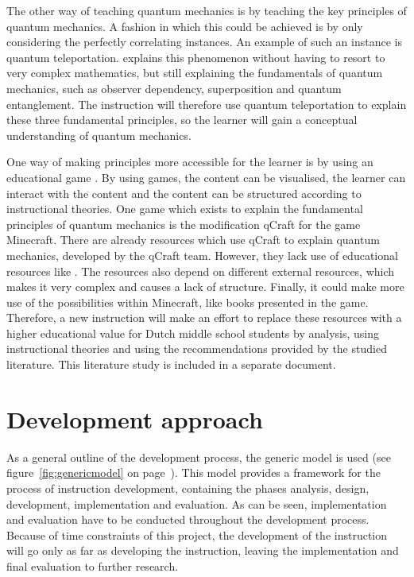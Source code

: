 \documentclass[11pt,twoside]{report} %
\begin{document}
The other way of teaching quantum mechanics is by teaching the key principles of quantum mechanics. A fashion in which this could be achieved is by only considering the perfectly correlating instances. An example of such an instance is quantum teleportation.  explains this phenomenon without having to resort to very complex mathematics, but still explaining the fundamentals of quantum mechanics, such as observer dependency, superposition and quantum entanglement. The instruction will therefore use quantum teleportation to explain these three fundamental principles, so the learner will gain a conceptual understanding of quantum mechanics.

One way of making principles more accessible for the learner is by using an educational game \cite{wouters}. By using games, the content can be visualised, the learner can interact with the content and the content can be structured according to instructional theories. One game which exists to explain the fundamental principles of quantum mechanics is the modification qCraft for the game Minecraft. There are already resources which use qCraft to explain quantum mechanics, developed by the qCraft team. However, they lack use of educational resources like . The resources also depend on different external resources, which makes it very complex and causes a lack of structure. Finally, it could make more use of the possibilities within Minecraft, like books presented in the game. Therefore, a new instruction will make an effort to replace these resources with a higher educational value for Dutch middle school students by analysis, using instructional theories and using the recommendations provided by the studied literature. This literature study is included in a separate document.

\section{Development approach}

As a general outline of the development process, the generic model is used \cite{genericmodel} (see figure~\ref{fig:genericmodel} on page~\pageref{fig:genericmodel}). This model provides a framework for the process of instruction development, containing the phases analysis, design, development, implementation and evaluation. As can be seen, implementation and evaluation have to be conducted throughout the development process. Because of time constraints of this project, the development of the instruction will go only as far as developing the instruction, leaving the implementation and final evaluation to further research.
\end{document}
